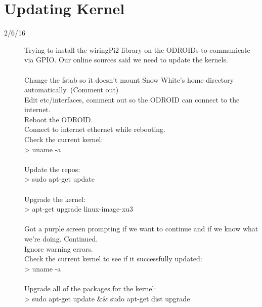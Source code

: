 \section{Updating Kernel}
\begin{description}
\item [2/6/16] Trying to install the wiringPi2 library on the ODROIDs to communicate via GPIO. Our online sources said we need to update the kernels. \\ \\
Change the fstab so it doesn't mount Snow White's home directory automatically. (Comment out) \\
Edit etc/interfaces, comment out so the ODROID can connect to the internet.\\
Reboot the ODROID.\\
Connect to internet ethernet while rebooting. \\
Check the current kernel: \\
> uname -a \\ \\
Update the repos: \\
> sudo apt-get update \\ \\
Upgrade the kernel: \\
> apt-get upgrade linux-image-xu3 \\ \\
Got a purple screen prompting if we want to continue and if we know what we're doing. Continued. \\
Ignore warning errors. \\
Check the current kernel to see if it successfully updated: \\
> uname -a \\ \\
Upgrade all of the packages for the kernel: \\
> sudo apt-get update \&\& sudo apt-get dist upgrade
\end{description}

